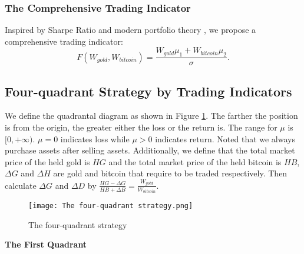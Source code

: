 \documentclass[12pt]{article}
\begin{document}
\subsubsection{The Comprehensive Trading Indicator}
Inspired by Sharpe Ratio and modern portfolio theory \cite{9, 12}, we propose a comprehensive trading indicator:
\begin{equation*}
F(W_{gold}, W_{bitcoin})=\frac{W_{gold}\mu_1+W_{bitcoin}\mu_2}{\sigma}.
\end{equation*}

\subsection{Four-quadrant Strategy by Trading Indicators}
We define the quadrantal diagram as shown in Figure \ref{F9}. The farther the position is from the origin, the greater either the loss or the return is. The range for $\mu$ is $[0, +\infty)$. $\mu=0$ indicates loss while $\mu>0$ indicates return. Noted that we always purchase assets after selling assets. Additionally, we define that the total market price of the held gold is $HG$ and the total market price of the held bitcoin is $HB$, $\Delta G$ and $\Delta H$ are gold and bitcoin that require to be traded respectively. Then calculate $\Delta G$ and $\Delta D$ by $\frac{HG-\Delta G}{HB+\Delta B}=\frac{W_{gold}}{W_{bitcoin}}$.
\begin{figure}[hbt]
 \centering
 \texttt{[image: The four-quadrant strategy.png]}
 \caption{The four-quadrant strategy}
 \label{F9} %
\end{figure}

\noindent
\textbf{The First Quadrant}
\end{document}
